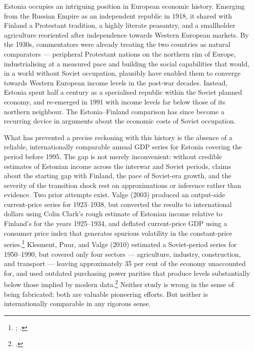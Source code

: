 \documentclass[12pt,a4paper]{article}
\begin{document}
Estonia occupies an intriguing position in European economic history. Emerging from the Russian Empire as an independent republic in 1918, it shared with Finland a Protestant tradition, a highly literate peasantry, and a smallholder agriculture reoriented after independence towards Western European markets. By the 1930s, commentators were already treating the two countries as natural comparators — peripheral Protestant nations on the northern rim of Europe, industrialising at a measured pace and building the social capabilities that would, in a world without Soviet occupation, plausibly have enabled them to converge towards Western European income levels in the post-war decades. Instead, Estonia spent half a century as a specialised republic within the Soviet planned economy, and re-emerged in 1991 with income levels far below those of its northern neighbour. The Estonia--Finland comparison has since become a recurring device in arguments about the economic costs of Soviet occupation.

What has prevented a precise reckoning with this history is the absence of a reliable, internationally comparable annual GDP series for Estonia covering the period before 1995. The gap is not merely inconvenient: without credible estimates of Estonian income across the interwar and Soviet periods, claims about the starting gap with Finland, the pace of Soviet-era growth, and the severity of the transition shock rest on approximations or inference rather than evidence. Two prior attempts exist. Valge (2003) produced an output-side current-price series for 1923--1938, but converted the results to international dollars using Colin Clark's rough estimate of Estonian income relative to Finland's for the years 1925--1934, and deflated current-price GDP using a consumer price index that generates spurious volatility in the constant-price series.\footnote{\autocite{valge2003all}; \autocite[60]{clark1938}.} Klesment, Puur, and Valge (2010) estimated a Soviet-period series for 1950--1990, but covered only four sectors — agriculture, industry, construction, and transport — leaving approximately 35 per cent of the economy unaccounted for, and used outdated purchasing power parities that produce levels substantially below those implied by modern data.\footnote{\autocite{klesment2010}.} Neither study is wrong in the sense of being fabricated; both are valuable pioneering efforts. But neither is internationally comparable in any rigorous sense.
\end{document}
